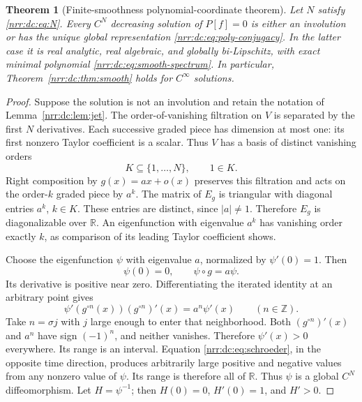 \documentclass[11pt,letterpaper]{article}
\newtheorem{theorem}{Theorem}[section]
\theoremstyle{definition}
\theoremstyle{remark}
\newcommand{\R}{\mathbb R}
\newcommand{\Z}{\mathbb Z}
\begin{document}
\begin{theorem}[Finite-smoothness polynomial-coordinate theorem]
\label{nrr:dc:thm:finite-threshold}
Let $N$ satisfy \eqref{nrr:dc:eq:N}. Every $C^N$ decreasing solution of
$P[f]=0$ is either an involution or has the unique global representation
\eqref{nrr:dc:eq:poly-conjugacy}. In the latter case it is real analytic,
real algebraic, and globally bi-Lipschitz, with exact minimal polynomial
\eqref{nrr:dc:eq:smooth-spectrum}. In particular,
Theorem~\ref{nrr:dc:thm:smooth} holds for $C^\infty$ solutions.
\end{theorem}
\begin{proof}
Suppose the solution is not an involution and retain the notation of
Lemma~\ref{nrr:dc:lem:jet}. The order-of-vanishing filtration on $V$ is
separated by the first $N$ derivatives. Each successive graded piece
has dimension at most one: its first nonzero Taylor coefficient is a
scalar. Thus $V$ has a basis of distinct vanishing orders
\[
 K\subseteq\{1,\ldots,N\},\qquad 1\in K.
\]
Right composition by $g(x)=ax+o(x)$ preserves this filtration and acts
on the order-$k$ graded piece by $a^k$. The matrix of $E_g$ is triangular
with diagonal entries $a^k$, $k\in K$. These entries are distinct, since
$|a|\ne1$. Therefore $E_g$ is diagonalizable over $\R$.
An eigenfunction with eigenvalue $a^k$ has vanishing order exactly $k$,
as comparison of its leading Taylor coefficient shows.

Choose the eigenfunction $\psi$ with eigenvalue $a$, normalized by
$\psi'(0)=1$. Then
\begin{equation}
 \psi(0)=0,\qquad \psi\circ g=a\psi.
 \label{nrr:dc:eq:schroeder}
\end{equation}
Its derivative is positive near zero. Differentiating the iterated
identity at an arbitrary point gives
\begin{equation}
 \psi'(g^{\circ n}(x))(g^{\circ n})'(x)=a^n\psi'(x)
 \qquad(n\in\Z).
 \label{nrr:dc:eq:propagate-derivative}
\end{equation}
Take $n=\sigma j$ with $j$ large enough to enter that neighborhood.
Both $(g^{\circ n})'(x)$ and $a^n$ have sign $(-1)^n$, and neither
vanishes. Therefore $\psi'(x)>0$ everywhere.
Its range is an interval. Equation \eqref{nrr:dc:eq:schroeder}, in the
opposite time direction, produces arbitrarily large positive and
negative values from any nonzero value of $\psi$. Its range is
therefore all of $\R$. Thus $\psi$ is a global $C^N$ diffeomorphism.
Let $H=\psi^{-1}$; then $H(0)=0$, $H'(0)=1$, and $H'>0$.


\end{proof}
\end{document}
